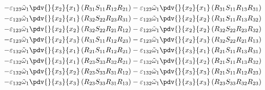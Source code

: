 \begin{equation}
	\begin{split}
		-\varepsilon_{123}\tilde{\omega}_{1}\pdv{}{x_{2}}{x_{1}}\left(R_{31}S_{11}R_{12}R_{21}\right)		-\varepsilon_{123}\tilde{\omega}_{1}\pdv{}{x_{2}}{x_{1}}\left(R_{31}S_{11}R_{13}R_{31}\right)\\
		-\varepsilon_{123}\tilde{\omega}_{1}\pdv{}{x_{2}}{x_{1}}\left(R_{32}S_{22}R_{23}R_{31}\right)		-\varepsilon_{123}\tilde{\omega}_{1}\pdv{}{x_{2}}{x_{2}}\left(R_{31}S_{11}R_{13}R_{32}\right)\\
		-\varepsilon_{123}\tilde{\omega}_{1}\pdv{}{x_{2}}{x_{2}}\left(R_{32}S_{22}R_{21}R_{12}\right)		-\varepsilon_{123}\tilde{\omega}_{1}\pdv{}{x_{2}}{x_{2}}\left(R_{32}S_{22}R_{23}R_{32}\right)\\
		-\varepsilon_{123}\tilde{\omega}_{1}\pdv{}{x_{2}}{x_{3}}\left(R_{31}S_{11}R_{12}R_{23}\right)		-\varepsilon_{123}\tilde{\omega}_{1}\pdv{}{x_{2}}{x_{3}}\left(R_{32}S_{22}R_{21}R_{13}\right)\\
		-\varepsilon_{132}\tilde{\omega}_{1}\pdv{}{x_{3}}{x_{1}}\left(R_{21}S_{11}R_{12}R_{21}\right)		-\varepsilon_{132}\tilde{\omega}_{1}\pdv{}{x_{3}}{x_{1}}\left(R_{21}S_{11}R_{13}R_{31}\right)\\
		-\varepsilon_{132}\tilde{\omega}_{1}\pdv{}{x_{3}}{x_{1}}\left(R_{23}S_{33}R_{32}R_{21}\right)		-\varepsilon_{132}\tilde{\omega}_{1}\pdv{}{x_{3}}{x_{2}}\left(R_{21}S_{11}R_{13}R_{32}\right)\\
		-\varepsilon_{132}\tilde{\omega}_{1}\pdv{}{x_{3}}{x_{2}}\left(R_{23}S_{33}R_{31}R_{12}\right)		-\varepsilon_{132}\tilde{\omega}_{1}\pdv{}{x_{3}}{x_{3}}\left(R_{21}S_{11}R_{12}R_{23}\right)\\
		-\varepsilon_{132}\tilde{\omega}_{1}\pdv{}{x_{3}}{x_{3}}\left(R_{23}S_{33}R_{31}R_{13}\right)		-\varepsilon_{132}\tilde{\omega}_{1}\pdv{}{x_{3}}{x_{3}}\left(R_{23}S_{33}R_{32}R_{23}\right)\\
	\end{split}
\end{equation}
